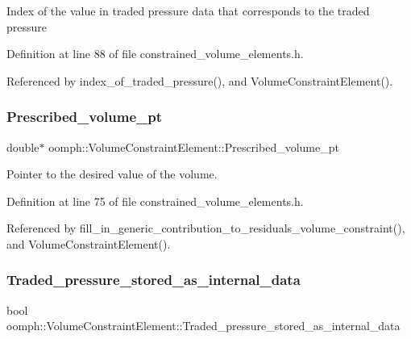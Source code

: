 Index of the value in traded pressure data that corresponds to the traded pressure 

Definition at line 88 of file constrained\+\_\+volume\+\_\+elements.\+h.



Referenced by index\+\_\+of\+\_\+traded\+\_\+pressure(), and Volume\+Constraint\+Element().

\mbox{\label{classoomph_1_1VolumeConstraintElement_ae109f08c27d29b0749b46285703cb16f}} 
\subsubsection{\texorpdfstring{Prescribed\+\_\+volume\+\_\+pt}{Prescribed\_volume\_pt}}
{\footnotesize\ttfamily double$\ast$ oomph\+::\+Volume\+Constraint\+Element\+::\+Prescribed\+\_\+volume\+\_\+pt\hspace{0.3cm}{\ttfamily [private]}}



Pointer to the desired value of the volume. 



Definition at line 75 of file constrained\+\_\+volume\+\_\+elements.\+h.



Referenced by fill\+\_\+in\+\_\+generic\+\_\+contribution\+\_\+to\+\_\+residuals\+\_\+volume\+\_\+constraint(), and Volume\+Constraint\+Element().

\mbox{\label{classoomph_1_1VolumeConstraintElement_ac4275cd18ae758b71ba4191aa2ff9a28}} 
\subsubsection{\texorpdfstring{Traded\+\_\+pressure\+\_\+stored\+\_\+as\+\_\+internal\+\_\+data}{Traded\_pressure\_stored\_as\_internal\_data}}
{\footnotesize\ttfamily bool oomph\+::\+Volume\+Constraint\+Element\+::\+Traded\+\_\+pressure\+\_\+stored\+\_\+as\+\_\+internal\+\_\+data\hspace{0.3cm}{\ttfamily [private]}}



